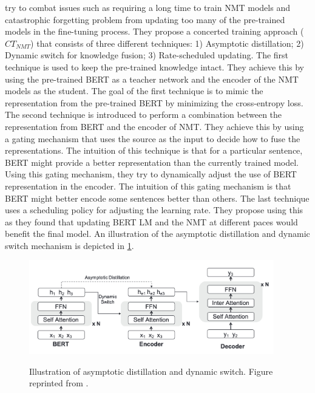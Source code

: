  try to combat issues such as requiring a long time to train NMT models and catastrophic forgetting problem from updating too many of the pre-trained models in the fine-tuning process. They propose a concerted training approach ($CT_{NMT}$) that consists of three different techniques: 1) Asymptotic distillation; 2) Dynamic switch for knowledge fusion; 3) Rate-scheduled updating. The first technique is used to keep the pre-trained knowledge intact. They achieve this by using the pre-trained BERT as a teacher network and the encoder of the NMT models as the student. The goal of the first technique is to mimic the representation from the pre-trained BERT by minimizing the cross-entropy loss. The second technique is introduced to perform a combination between the representation from BERT and the encoder of NMT. They achieve this by using a gating mechanism that uses the source as the input to decide how to fuse the representations. The intuition of this technique is that for a particular sentence, BERT might provide a better representation than the currently trained model. Using this gating mechanism, they try to dynamically adjust the use of BERT representation in the encoder. The intuition of this gating mechanism is that BERT might better encode some sentences better than others. The last technique uses a scheduling policy for adjusting the learning rate. They propose using this as they found that updating BERT LM and the NMT at different paces would benefit the final model. An illustration of the asymptotic distillation and dynamic switch mechanism is depicted in \cref{img:ctnmt}.

\begin{figure}[h]
    {\includegraphics[width=0.95\textwidth]{img/ctnmt.png}}
    \centering
    \caption{Illustration of asymptotic distillation and dynamic switch. Figure reprinted from .}
    \label{img:ctnmt}
\end{figure}

